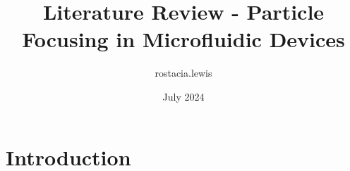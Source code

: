 \documentclass{article}
\title{Literature Review - Particle Focusing in Microfluidic Devices}
\author{rostacia.lewis }
\date{July 2024}
\begin{document}
\maketitle

\section{Introduction}
\end{document}
